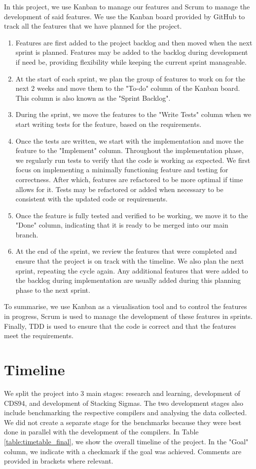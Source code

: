 In this project, we use Kanban to manage our features and Scrum to manage the development 
of said features. We use the Kanban board provided by GitHub to track all 
the features that we have planned for the project.
\begin{enumerate}
  \item Features are first added to the project backlog and then moved when the next sprint is
  planned. Features may be added to the backlog during development if need be, providing 
  flexibility while keeping the current sprint manageable. 
  \item At the start of each sprint, we plan the group of features to work on 
  for the next 2 weeks and move them to the "To-do" column of the Kanban board. This column 
  is also known as the "Sprint Backlog".
  \item During the sprint, we move the features to the "Write Tests" column when we start writing 
  tests for the feature, based on the requirements.
  \item Once the tests are written, we start with the implementation and 
  move the feature to the "Implement" column. Throughout the implementation phase, we regularly 
  run tests to verify that the code is working as expected. We first focus on implementing 
  a minimally functioning feature and testing for correctness. After which, features are 
  refactored to be more optimal if time allows for it. Tests may be refactored or added 
  when necessary to be consistent with the updated code or requirements.
  \item Once the feature is 
  fully tested and verified to be working, we move it to the "Done" column, indicating that 
  it is ready to be merged into our main branch. 
  \item At the end of the sprint, we review the features that were completed and ensure that 
  the project is on track with the timeline. We also plan the next sprint, repeating the cycle 
  again. Any additional features that were added to the backlog during implementation are 
  usually added during this planning phase to the next sprint.
\end{enumerate} 

To summarise, we use Kanban as a visualisation tool and to control the features in progress, Scrum 
is used to manage the development of these features in sprints. Finally, TDD is used to ensure 
that the code is correct and that the features meet the requirements. 

\section{Timeline}
We split the project into 3 main stages: research and learning, development of CDS94, and 
development of Stacking Sigmas. The two development stages also include benchmarking the 
respective compilers and analysing the data collected. We did not create a separate stage 
for the benchmarks because they were best done in parallel with the development of the
compilers.
In Table \ref{table:timetable_final}, we show the overall timeline of the project. In the "Goal" 
column, we indicate with a checkmark if the goal was achieved. Comments are provided in 
brackets where relevant. 


